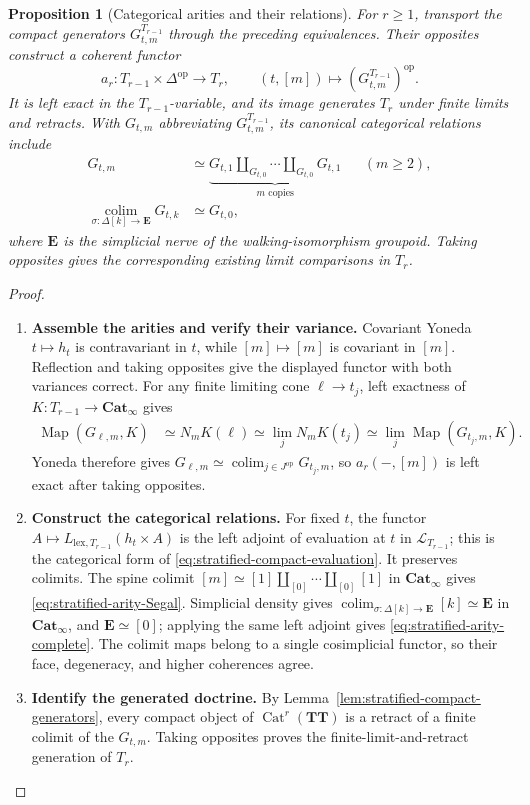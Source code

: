 \documentclass[oneside]{article}
\theoremstyle{plain}
\newtheorem{proposition}[theorem]{Proposition}
\theoremstyle{definition}
\theoremstyle{remark}
\newcommand{\Cat}{\mathbf{Cat}_{\infty}}
\newcommand{\Map}{\operatorname{Map}}
\newcommand{\TT}{\mathbf{TT}}
\newcommand{\colim}{\operatorname*{colim}}
\newcommand{\op}{\mathrm{op}}
\begin{document}
\begin{proposition}[Categorical arities and their relations]
\label{prop:stratified-categorical-arities}
For $r\geq1$, transport the compact generators
$G^{T_{r-1}}_{t,m}$ through the preceding equivalences.  Their
opposites construct a coherent functor
\[
 a_r:T_{r-1}\times\Delta^{\op}\longrightarrow T_r,
 \qquad (t,[m])\longmapsto(G^{T_{r-1}}_{t,m})^{\op}.
\]
It is left exact in the $T_{r-1}$-variable, and its image generates
$T_r$ under finite limits and retracts.  With $G_{t,m}$ abbreviating
$G^{T_{r-1}}_{t,m}$, its canonical categorical relations include
\begin{align}
 G_{t,m}&\simeq
 \underbrace{G_{t,1}\amalg_{G_{t,0}}\cdots
 \amalg_{G_{t,0}}G_{t,1}}_{m\text{ copies}}
 &&(m\geq2),\label{eq:stratified-arity-Segal}\\
 \operatorname*{colim}_{\sigma:\Delta[k]\to\mathbf E}G_{t,k}
 &\simeq G_{t,0},\label{eq:stratified-arity-complete}
\end{align}
where $\mathbf E$ is the simplicial nerve of the walking-isomorphism
groupoid.  Taking opposites gives the corresponding existing limit
comparisons in $T_r$.
\end{proposition}
\begin{proof}
\leavevmode
\begin{enumerate}
\item \textbf{Assemble the arities and verify their variance.}
Covariant Yoneda $t\mapsto h_t$ is contravariant in $t$, while
$[m]\mapsto[m]$ is covariant in $[m]$.  Reflection and taking
opposites give the displayed functor with both variances correct.
For any finite limiting cone $\ell\to t_j$, left exactness of
$K:T_{r-1}\to\Cat$ gives
\begin{align*}
 \Map(G_{\ell,m},K)
 &\simeq N_mK(\ell)
 \simeq\lim_jN_mK(t_j)
 \simeq\lim_j\Map(G_{t_j,m},K).
\end{align*}
Yoneda therefore gives
$G_{\ell,m}\simeq\colim_{j\in J^{\op}}G_{t_j,m}$,
so $a_r(-,[m])$ is left exact after taking opposites.
\item \textbf{Construct the categorical relations.}
For fixed $t$, the functor
$A\mapsto L_{\mathrm{lex},T_{r-1}}(h_t\times A)$ is the left
adjoint of evaluation at $t$ in $\mathcal L_{T_{r-1}}$;
this is the categorical form of
\eqref{eq:stratified-compact-evaluation}.  It preserves colimits.
The spine colimit
$[m]\simeq[1]\amalg_{[0]}\cdots\amalg_{[0]}[1]$ in $\Cat$
gives \eqref{eq:stratified-arity-Segal}.  Simplicial density gives
$\colim_{\sigma:\Delta[k]\to\mathbf E}[k]\simeq\mathbf E$ in
$\Cat$, and $\mathbf E\simeq[0]$; applying the same left adjoint
gives \eqref{eq:stratified-arity-complete}.  The colimit maps belong
to a single cosimplicial functor, so their face, degeneracy, and
higher coherences agree.
\item \textbf{Identify the generated doctrine.}
By Lemma~\ref{lem:stratified-compact-generators}, every compact object
of $\operatorname{Cat}^r(\TT)$ is a retract of a finite colimit
of the $G_{t,m}$.  Taking opposites proves the finite-limit-and-retract
generation of $T_r$.\qedhere
\end{enumerate}
\end{proof}
\end{document}
